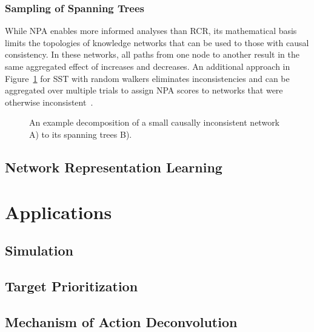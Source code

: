 \subsubsection{Sampling of Spanning Trees}

While \ac{NPA} enables more informed analyses than \ac{RCR}, its mathematical basis limits the topologies of knowledge networks that can be used to those with causal consistency.
In these networks, all paths from one node to another result in the same aggregated effect of increases and decreases.
An additional approach in Figure~\ref{fig:sst_schematic} for \ac{SST} with random walkers eliminates inconsistencies and can be aggregated over multiple trials to assign \ac{NPA} scores to networks that were otherwise inconsistent~\cite{Vasilyev2014}.

\begin{figure}
\captionsetup{format=plain}
\caption[Decomposition of Spanning Trees]{An example decomposition of a small causally inconsistent network A) to its spanning trees B)\cite{Vasilyev2014}.}
\label{fig:sst_schematic}
\end{figure}

\subsection{Network Representation Learning}

\section{Applications}
\subsection{Simulation}
\subsection{Target Prioritization}
\subsection{Mechanism of Action Deconvolution}
